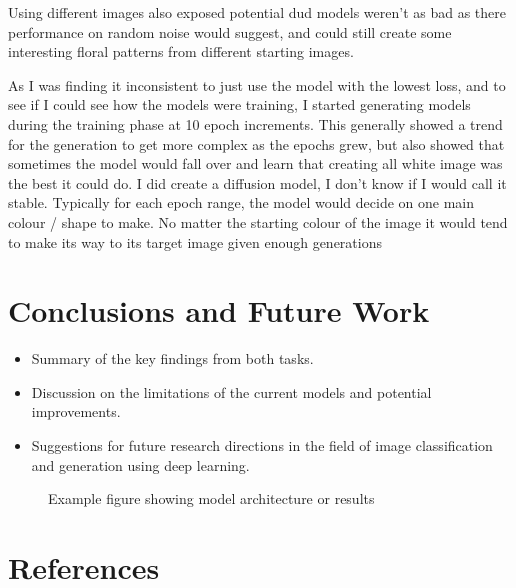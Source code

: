 \documentclass[12pt]{article}
\begin{document}
Using different images also exposed potential dud models weren't as bad as there performance on random noise would suggest, and could still create some interesting floral patterns from 
different starting images.

As I was finding it inconsistent to just use the model with the lowest loss, and to see if I could see how the models were training, I started generating models during the training phase
at 10 epoch increments. This generally showed a trend for the generation to get more complex as the epochs grew, but also showed that sometimes the model would fall over and learn that 
creating all white image was the best it could do. I did create a diffusion model, I don't know if I would call it stable. Typically for each epoch range, the model would decide on one
main colour / shape to make. No matter the starting colour of the image it would tend to make its way to its target image given enough generations


\section{Conclusions and Future Work}
\begin{itemize}
    \item Summary of the key findings from both tasks.
    \item Discussion on the limitations of the current models and potential improvements.
    \item Suggestions for future research directions in the field of image classification and generation using deep learning.
\end{itemize}

\begin{figure}[h!]
    \centering
    \caption{\label{fig:example}Example figure showing model architecture or results}
\end{figure}

\section{References}
\end{document}
